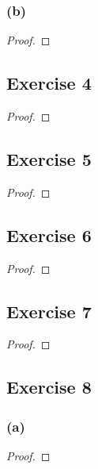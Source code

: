 \documentclass[14pt]{extarticle}
\begin{document}
\subsubsection{(b)}

\begin{proof}

\end{proof}

\subsection{Exercise 4}

\begin{proof}

\end{proof}

\subsection{Exercise 5}

\begin{proof}

\end{proof}

\subsection{Exercise 6}

\begin{proof}

\end{proof}

\subsection{Exercise 7}

\begin{proof}

\end{proof}

\subsection{Exercise 8}

\subsubsection{(a)}

\begin{proof}

\end{proof}
\end{document}
